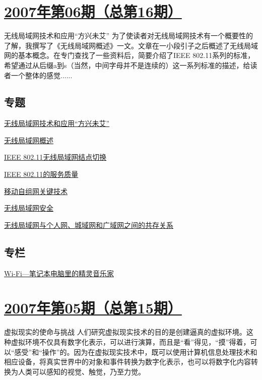 \documentclass[a4paper]{article}
\begin{document}
\section{\href{http://history.ccf.org.cn/sites/ccf/jsjtbbd.jsp?contentId=2542567628965}{\textbf{2007年第06期（总第16期）}}}
无线局域网技术和应用“方兴未艾” 为了使读者对无线局域网技术有一个概要性的了解，我撰写了《无线局域网概述》一文。文章在一小段引子之后概述了无线局域网的基本概念。在专门查找了一些资料后，简要介绍了IEEE 802.11系列的标准，希望通过从后缀a到s（当然，中间字母并不是连续的）这一系列标准的描述，给读者一个整体的感觉......
\subsection{专题}
\href{http://history.ccf.org.cn/resources/1190201776262/2010/04/15/016016.pdf}{无线局域网技术和应用“方兴未艾”}

\href{http://history.ccf.org.cn/resources/1190201776262/2010/04/15/016019.pdf}{无线局域网概述}

\href{http://history.ccf.org.cn/resources/1190201776262/2010/04/15/016028.pdf}{IEEE 802.11无线局域网结点切换}

\href{http://history.ccf.org.cn/resources/1190201776262/2010/04/15/016035.pdf}{IEEE 802.11的服务质量}

\href{http://history.ccf.org.cn/resources/1190201776262/2010/04/15/016042.pdf}{移动自组网关键技术}

\href{http://history.ccf.org.cn/resources/1190201776262/2010/04/15/016060.pdf}{无线局域网安全}

\href{http://history.ccf.org.cn/resources/1190201776262/2010/04/15/016067.pdf}{无线局域网与个人网、城域网和广域网之间的共存关系}

\subsection{专栏}
\href{http://history.ccf.org.cn/resources/1190201776262/2010/04/15/016080.pdf}{Wi-Fi—笔记本电脑里的精灵音乐家}


\section{\href{http://history.ccf.org.cn/sites/ccf/jsjtbbd.jsp?contentId=2542567628962}{\textbf{2007年第05期（总第15期）}}}
虚拟现实的使命与挑战 人们研究虚拟现实技术的目的是创建逼真的虚拟环境。这种虚拟环境不仅具有数字化表示，可以进行演算，而且是“看”得见，“摸”得着，可以“感受”和“操作”的。因为在虚拟现实技术中，既可以使用计算机信息处理技术和相应设备，将真实世界中的对象和事件转换为数字化表示，也可以将数字化内容转换为人类可以感知的视觉、触觉，乃至力觉。
\end{document}
